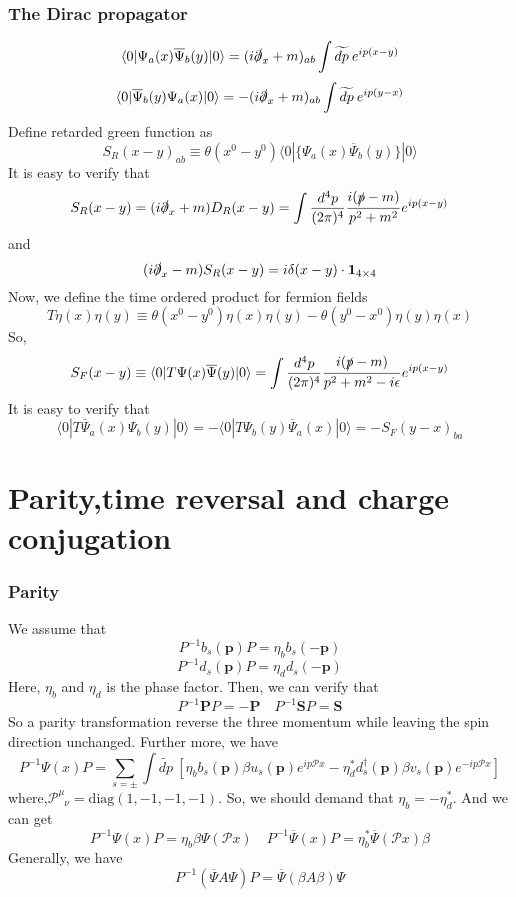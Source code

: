 \documentclass[cyan]{elegantnote}
\begin{document}
\subsubsection{The Dirac propagator}
\[\langle 0 | \Psi_a(x)\overline{\Psi}_b(y)|0\rangle = (i\slashed{\partial}_x+m)_{ab} \int \widetilde{dp} \: e^{ip(x-y)}\]
\[\langle 0 | \overline{\Psi}_b(y) \Psi_a(x)|0\rangle = -(i\slashed{\partial}_x+m)_{ab} \int \widetilde{dp} \: e^{ip(y-x)}\]
Define retarded green function as
\[S_{R}(x-y)_{ab} \equiv \theta(x^0-y^0) \langle 0 | \{\Psi_a(x)\overline{\Psi}_b(y)\}|0\rangle\]
It is easy to verify that
\[S_{R}(x-y) = (i\slashed{\partial}_x+m) D_R(x-y) = \int \frac{d^4p}{(2\pi)^4} \frac{i(\slashed{p}-m)}{p^2+m^2} e^{ip(x-y)}\]
and
\[(i\slashed{\partial}_x-m) S_R(x-y) = i\delta(x-y) \cdot \bm{1}_{4\times 4}\]
Now, we  define  the time ordered product for fermion fields
\[T \eta(x) \eta(y) \equiv \theta(x^0-y^0)\eta(x)\eta(y) - \theta(y^0-x^0)\eta(y)\eta(x)\]
So,
\[S_F(x-y) \equiv \langle 0 | T \Psi(x)\overline{\Psi}(y)|0\rangle =  \int \frac{d^4p}{(2\pi)^4} \frac{i(\slashed{p}-m)}{p^2+m^2 - i\epsilon} e^{ip(x-y)}\]
It is easy to verify that
\[\langle 0 | T \overline{\Psi}_a(x) \Psi_b(y)|0\rangle = - \langle 0 | T \Psi_b(y) \overline{\Psi}_a(x)|0\rangle = -S_F(y-x)_{ba}\]

\section{Parity,time reversal and charge conjugation}
\subsubsection{Parity}
\noindent
We assume that
\[P^{-1} b_s(\bm{p})P = \eta_b b_s(\bm{-p})\]
\[P^{-1} d_s(\bm{p})P = \eta_d d_s(\bm{-p})\]
Here, $\eta_b$ and $\eta_d$ is the phase factor. Then, we can verify that
\[P^{-1} \bm{P} P = -\bm{P} \quad P^{-1} \bm{S} P =  \bm{S}\]
So a parity transformation reverse the three momentum while leaving the spin direction unchanged. Further more, we have
\[P^{-1}\Psi(x)P = \sum_{s=\pm} \int \widetilde{dp} \: \left [ \eta_b b_s(\bm{p})\beta u_s(\bm{p})e^{ip\mathcal{P}x} - \eta_d^* d^{\dagger}_s(\bm{p}) \beta v_s(\bm{p})e^{-ip\mathcal{P}x} \right ]\]
where,$\mathcal{P}^{\mu}_{\phantom{\mu}\nu} = \mathrm{diag}(1,-1,-1,-1)$.
So, we should demand that $\eta_b = -\eta^*_d$. And we can get
\[P^{-1}\Psi(x)P = \eta_b \beta \Psi(\mathcal{P}x) \quad P^{-1}\overline{\Psi}(x)P = \eta^*_b  \overline{\Psi}(\mathcal{P}x)\beta \]
Generally, we have
\[P^{-1} (\overline{\Psi} A \Psi) P = \overline{\Psi}(\beta A \beta)\Psi\]
\end{document}
